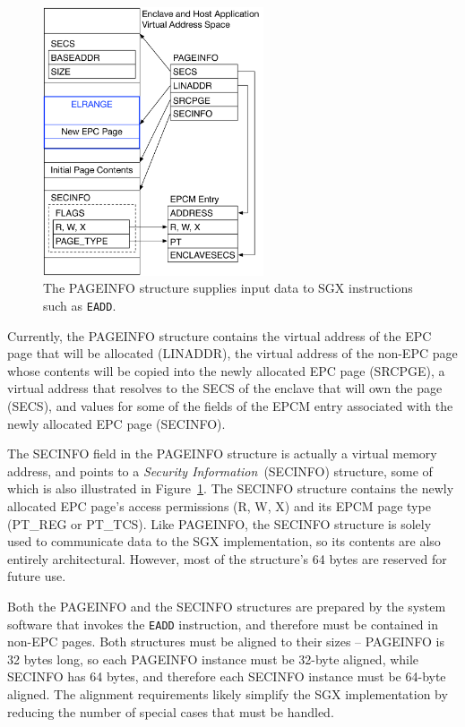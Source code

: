\begin{figure}[hbt]
  \centering
  \includegraphics[width=65mm]{figures/sgx_pageinfo.pdf}
  \caption{
    The PAGEINFO structure supplies input data to SGX instructions such as
    \texttt{EADD}.
  }
  \label{fig:sgx_pageinfo}
\end{figure}

Currently, the PAGEINFO structure contains the virtual address of the EPC page
that will be allocated (LINADDR), the virtual address of the non-EPC page whose
contents will be copied into the newly allocated EPC page (SRCPGE), a virtual
address that resolves to the SECS of the enclave that will own the page (SECS),
and values for some of the fields of the EPCM entry associated with the newly
allocated EPC page (SECINFO).

The SECINFO field in the PAGEINFO structure is actually a virtual memory
address, and points to a \textit{Security Information}~(SECINFO) structure,
some of which is also illustrated in Figure~\ref{fig:sgx_pageinfo}. The SECINFO
structure contains the newly allocated EPC page's access permissions (R, W, X)
and its EPCM page type (PT\_REG or PT\_TCS). Like PAGEINFO, the SECINFO
structure is solely used to communicate data to the SGX implementation, so its
contents are also entirely architectural. However, most of the structure's
64 bytes are reserved for future use.

Both the PAGEINFO and the SECINFO structures are prepared by the system
software that invokes the \texttt{EADD} instruction, and therefore must be
contained in non-EPC pages. Both structures must be aligned to their sizes --
PAGEINFO is 32 bytes long, so each PAGEINFO instance must be 32-byte aligned,
while SECINFO has 64 bytes, and therefore each SECINFO instance must be
64-byte aligned. The alignment requirements likely simplify the SGX
implementation by reducing the number of special cases that must be handled.

